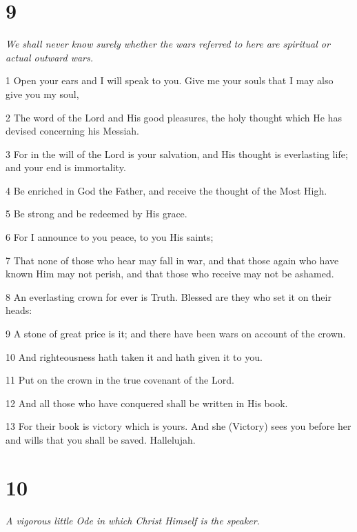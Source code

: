 \chapter{9}

\par \textit{We shall never know surely whether the wars referred to here are spiritual or actual outward wars.}

\par 1 Open your ears and I will speak to you. Give me your souls that I may also give you my soul,
\par 2 The word of the Lord and His good pleasures, the holy thought which He has devised concerning his Messiah.
\par 3 For in the will of the Lord is your salvation, and His thought is everlasting life; and your end is immortality.
\par 4 Be enriched in God the Father, and receive the thought of the Most High.
\par 5 Be strong and be redeemed by His grace.
\par 6 For I announce to you peace, to you His saints;
\par 7 That none of those who hear may fall in war, and that those again who have known Him may not perish, and that those who receive may not be ashamed.
\par 8 An everlasting crown for ever is Truth. Blessed are they who set it on their heads:
\par 9 A stone of great price is it; and there have been wars on account of the crown.
\par 10 And righteousness hath taken it and hath given it to you.
\par 11 Put on the crown in the true covenant of the Lord.
\par 12 And all those who have conquered shall be written in His book.
\par 13 For their book is victory which is yours. And she (Victory) sees you before her and wills that you shall be saved. Hallelujah.

\chapter{10}

\par \textit{A vigorous little Ode in which Christ Himself is the speaker.}

